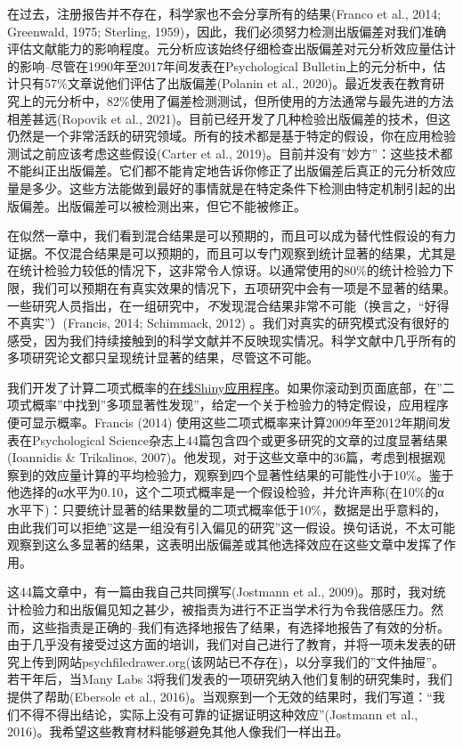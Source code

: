 \documentclass[
  letterpaper,
  DIV=11,
  numbers=noendperiod]{scrreprt}
\begin{document}
在过去，注册报告并不存在，科学家也不会分享所有的结果(Franco et al.,
2014; Greenwald, 1975; Sterling,
1959)，因此，我们必须努力检测出版偏差对我们准确评估文献能力的影响程度。元分析应该始终仔细检查出版偏差对元分析效应量估计的影响--尽管在1990年至2017年间发表在Psychological
Bulletin上的元分析中，估计只有57\%文章说他们评估了出版偏差(Polanin et
al.,
2020)。最近发表在教育研究上的元分析中，82\%使用了偏差检测测试，但所使用的方法通常与最先进的方法相差甚远(Ropovik
et al.,
2021)。目前已经开发了几种检验出版偏差的技术，但这仍然是一个非常活跃的研究领域。所有的技术都是基于特定的假设，你在应用检验测试之前应该考虑这些假设(Carter
et al.,
2019)。目前并没有''妙方''：这些技术都不能纠正出版偏差。它们都不能肯定地告诉你修正了出版偏差后真正的元分析效应量是多少。这些方法能做到最好的事情就是在特定条件下检测由特定机制引起的出版偏差。出版偏差可以被检测出来，但它不能被修正。

在似然一章中，我们看到混合结果是可以预期的，而且可以成为替代性假设的有力证据。不仅混合结果是可以预期的，而且可以专门观察到统计显著的结果，尤其是在统计检验力较低的情况下，这非常令人惊讶。以通常使用的80\%的统计检验力下限，我们可以预期在有真实效果的情况下，五项研究中会有一项是不显著的结果。一些研究人员指出，在一组研究中，\emph{不}发现混合结果非常不可能（换言之，``好得不真实''）(Francis,
2014; Schimmack, 2012)
。我们对真实的研究模式没有很好的感受，因为我们持续接触到的科学文献并不反映现实情况。科学文献中几乎所有的多项研究论文都只呈现统计显著的结果，尽管这不可能。

我们开发了计算二项式概率的\href{http://shiny.ieis.tue.nl/mixed_results_likelihood/}{在线Shiny应用程序}。如果你滚动到页面底部，在''二项式概率''中找到''多项显著性发现''，给定一个关于检验力的特定假设，应用程序便可显示概率。Francis
(2014) 使用这些二项式概率来计算2009年至2012年期间发表在Psychological
Science杂志上44篇包含四个或更多研究的文章的过度显著结果(Ioannidis \&
Trikalinos,
2007)。他发现，对于这些文章中的36篇，考虑到根据观察到的效应量计算的平均检验力，观察到四个显著性结果的可能性小于10\%。鉴于他选择的α水平为0.10，这个二项式概率是一个假设检验，并允许声称(在10\%的α水平下)：只要统计显著的结果数量的二项式概率低于10\%，数据是出乎意料的，由此我们可以拒绝''这是一组没有引入偏见的研究''这一假设。换句话说，不太可能观察到这么多显著的结果，这表明出版偏差或其他选择效应在这些文章中发挥了作用。

这44篇文章中，有一篇由我自己共同撰写(Jostmann et al.,
2009)。那时，我对统计检验力和出版偏见知之甚少，被指责为进行不正当学术行为令我倍感压力。然而，这些指责是正确的--我们有选择地报告了结果，有选择地报告了有效的分析。由于几乎没有接受过这方面的培训，我们对自己进行了教育，并将一项未发表的研究上传到网站psychfiledrawer.org(该网站已不存在)，以分享我们的''文件抽屉''。若干年后，当Many
Labs
3将我们发表的一项研究纳入他们复制的研究集时，我们提供了帮助(Ebersole et
al.,
2016)。当观察到一个无效的结果时，我们写道：``我们不得不得出结论，实际上没有可靠的证据证明这种效应''(Jostmann
et al., 2016)。我希望这些教育材料能够避免其他人像我们一样出丑。
\end{document}
